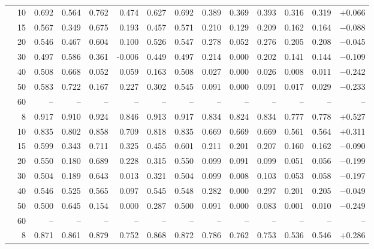\documentclass[conference]{IEEEtran}
\theoremstyle{remark}
\begin{document}
\begin{table}[ht]
{\begin{tabular}{p{1.55cm}r rrrr rr rr rrr r}
  & 10 & 0.692 & 0.564 & 0.762 & 0.474 & 0.627 & 0.692 & 0.389 & 0.369 & 0.393 & 0.316 & 0.319 & $+$0.066 \\
  & 15 & 0.567 & 0.349 & 0.675 & 0.193 & 0.457 & 0.571 & 0.210 & 0.129 & 0.209 & 0.162 & 0.164 & $-$0.088 \\
  & 20 & 0.546 & 0.467 & 0.604 & 0.100 & 0.526 & 0.547 & 0.278 & 0.052 & 0.276 & 0.205 & 0.208 & $-$0.045 \\
  & 30 & 0.497 & 0.586 & 0.361 & -0.006 & 0.449 & 0.497 & 0.214 & 0.000 & 0.202 & 0.141 & 0.144 & $-$0.109 \\
  & 40 & 0.508 & 0.668 & 0.052 & 0.059 & 0.163 & 0.508 & 0.027 & 0.000 & 0.026 & 0.008 & 0.011 & $-$0.242 \\
  & 50 & 0.583 & 0.722 & 0.167 & 0.227 & 0.302 & 0.545 & 0.091 & 0.000 & 0.091 & 0.017 & 0.029 & $-$0.233 \\
  & 60 & -- & -- & -- & -- & -- & -- & -- & -- & -- & -- & -- & -- \\
\midrule
{}
  & 8 & 0.917 & 0.910 & 0.924 & 0.846 & 0.913 & 0.917 & 0.834 & 0.824 & 0.834 & 0.777 & 0.778 & $+$0.527 \\
  & 10 & 0.835 & 0.802 & 0.858 & 0.709 & 0.818 & 0.835 & 0.669 & 0.669 & 0.669 & 0.561 & 0.564 & $+$0.311 \\
  & 15 & 0.599 & 0.343 & 0.711 & 0.325 & 0.455 & 0.601 & 0.211 & 0.201 & 0.207 & 0.160 & 0.162 & $-$0.090 \\
  & 20 & 0.550 & 0.180 & 0.689 & 0.228 & 0.315 & 0.550 & 0.099 & 0.091 & 0.099 & 0.051 & 0.056 & $-$0.199 \\
  & 30 & 0.504 & 0.189 & 0.643 & 0.013 & 0.321 & 0.504 & 0.099 & 0.008 & 0.103 & 0.053 & 0.058 & $-$0.197 \\
  & 40 & 0.546 & 0.525 & 0.565 & 0.097 & 0.545 & 0.548 & 0.282 & 0.000 & 0.297 & 0.201 & 0.205 & $-$0.049 \\
  & 50 & 0.500 & 0.645 & 0.154 & 0.000 & 0.287 & 0.500 & 0.091 & 0.000 & 0.083 & 0.001 & 0.010 & $-$0.249 \\
  & 60 & -- & -- & -- & -- & -- & -- & -- & -- & -- & -- & -- & -- \\
\midrule
{}
  & 8 & 0.871 & 0.861 & 0.879 & 0.752 & 0.868 & 0.872 & 0.786 & 0.762 & 0.753 & 0.536 & 0.546 & $+$0.286 \\

\end{tabular}}
\end{table}
\end{document}

